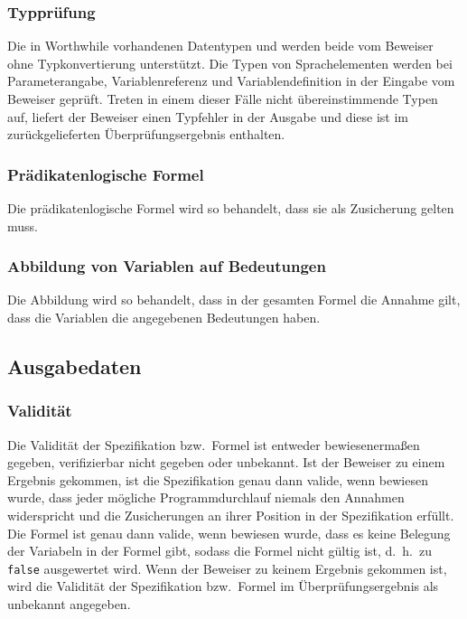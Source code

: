 \subsubsection{Typprüfung}%

Die in Worthwhile vorhandenen Datentypen \int{} und
\bool{} werden beide vom Beweiser ohne Typkonvertierung
unterstützt. Die Typen von Sprachelementen werden bei Parameterangabe,
Variablenreferenz und Variablendefinition in der Eingabe vom Beweiser
geprüft. Treten in einem dieser Fälle nicht übereinstimmende Typen
auf, liefert der Beweiser einen Typfehler in der Ausgabe und diese ist
im zurückgelieferten Überprüfungsergebnis enthalten.%

\subsubsection{Prädikatenlogische Formel}%

Die prädikatenlogische Formel wird so behandelt, dass sie als
Zusicherung gelten muss.%

\subsubsection{Abbildung von Variablen auf Bedeutungen}%

Die Abbildung wird so behandelt, dass in der gesamten Formel die
Annahme gilt, dass die Variablen die angegebenen Bedeutungen haben.%

\subsection{Ausgabedaten}%

\subsubsection{Validität}%

Die Validität der Spezifikation bzw.\ Formel ist entweder
bewiesenermaßen gegeben, verifizierbar nicht gegeben oder unbekannt.
Ist der Beweiser zu einem Ergebnis gekommen, ist die Spezifikation
genau dann valide, wenn bewiesen wurde, dass jeder mögliche
Programmdurchlauf niemals den Annahmen widerspricht und die
Zusicherungen an ihrer Position in der Spezifikation erfüllt. Die
Formel ist genau dann valide, wenn bewiesen wurde, dass es keine
Belegung der Variabeln in der Formel gibt, sodass die Formel nicht
gültig ist, d.~h.\ zu \texttt{false} ausgewertet wird. Wenn der
Beweiser zu keinem Ergebnis gekommen ist, wird die Validität der
Spezifikation bzw.\ Formel im Überprüfungsergebnis als unbekannt
angegeben.%


